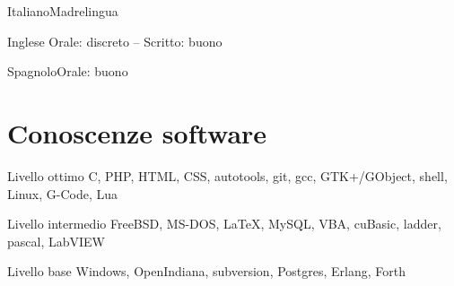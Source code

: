 \documentclass[fontsize=10pt]{tccv}
\begin{document}
\begin{factlist}
\item{Italiano}{Madrelingua}
\item{Inglese} {Orale: discreto -- Scritto: buono}
\item{Spagnolo}{Orale: buono}
\end{factlist}

\section{Conoscenze software}

\begin{factlist}

\item{Livello ottimo}
     {C, PHP, HTML, CSS, autotools, git, gcc, GTK+/GObject, shell,
      Linux, G-Code, Lua}

\item{Livello intermedio}
     {FreeBSD, MS-DOS, \LaTeX, MySQL, VBA, cuBasic, ladder, pascal,
      LabVIEW}

\item{Livello base}
     {Windows, OpenIndiana, subversion,  Postgres, Erlang, Forth}

\end{factlist}
\end{document}
